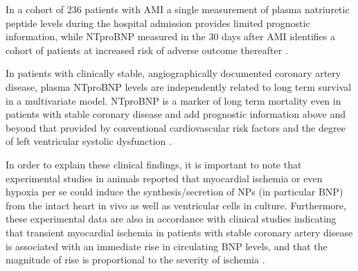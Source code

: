 \documentclass[14pt,a4paper,onecolumn]{extarticle}
\begin{document}
In a cohort of 236 patients with AMI a single measurement of plasma natriuretic peptide levels during the hospital admission provides limited prognostic information, while NTproBNP measured in the 30 days after AMI identifies a cohort of patients at increased risk of adverse outcome thereafter \citep{bib3240}.

In patients with clinically stable, angiographically documented coronary artery disease, plasma  NTproBNP levels are independently related to long term survival in a multivariate model.  NTproBNP is a marker of long term mortality even in patients with stable coronary disease and add prognostic information above and beyond that provided by conventional cardiovascular risk factors and the degree of left ventricular systolic dysfunction \citep{bib3242}.

In order to explain these clinical findings, it is important to note that experimental studies in animals reported that myocardial ischemia or even hypoxia per se could induce the synthesis/secretion of NPs (in particular BNP) from the intact heart in vivo as well as ventricular cells in culture. Furthermore, these experimental data are also in accordance with  clinical studies indicating that transient myocardial ischemia in patients with stable coronary artery disease is associated with an immediate rise in circulating BNP levels, and that the magnitude of rise is proportional to the severity of ischemia \citep{bib3164}.

\end{document}
